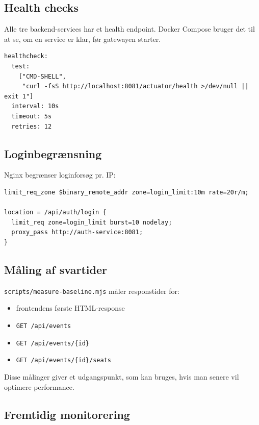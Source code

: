\documentclass[11pt,a4paper]{article}
\newcommand{\code}[1]{\texttt{#1}}
\begin{document}
\subsection{Health checks}

Alle tre backend-services har et health endpoint. Docker Compose bruger det til at se, om en service er klar, før gatewayen starter.

\begin{lstlisting}[caption={Eksempel på Docker Compose health check}]
healthcheck:
  test:
    ["CMD-SHELL",
     "curl -fsS http://localhost:8081/actuator/health >/dev/null || exit 1"]
  interval: 10s
  timeout: 5s
  retries: 12
\end{lstlisting}

\subsection{Loginbegrænsning}

Nginx begrænser loginforsøg pr. IP:

\begin{lstlisting}[caption={Login rate limiting i Nginx}]
limit_req_zone $binary_remote_addr zone=login_limit:10m rate=20r/m;

location = /api/auth/login {
  limit_req zone=login_limit burst=10 nodelay;
  proxy_pass http://auth-service:8081;
}
\end{lstlisting}

\subsection{Måling af svartider}

\code{scripts/measure-baseline.mjs} måler responstider for:

\begin{itemize}
  \item frontendens første HTML-response
  \item \code{GET /api/events}
  \item \code{GET /api/events/\{id\}}
  \item \code{GET /api/events/\{id\}/seats}
\end{itemize}

Disse målinger giver et udgangspunkt, som kan bruges, hvis man senere vil optimere performance.

\subsection{Fremtidig monitorering}
\end{document}
